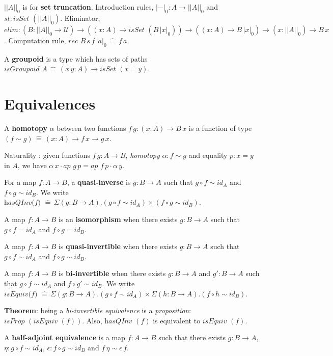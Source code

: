 \documentclass[a4paper]{article}
\begin{document}
$|| A ||_0$ is for \textbf{set truncation}. Introduction rules, $|-|_0 : A \to || A ||_0$ and $\textit{st}: \textit{isSet }(|| A ||_0)$. Eliminator, $\textit{elim}: (B : ||A||_0 \to \mathcal{U}) \to ((x : A) \to \textit{isSet }(B \, |x|_0)) \to ((x : A) \to B \, |x|_0) \to (x : || A ||_0) \to B \, x$. Computation rule, $\textit{rec } B \, s \, f \, |a|_0 \, \hat{=} \, f \, a$.

A \textbf{groupoid} is a type which has sets of paths $\textit{isGroupoid } A \, \hat{=} \, (x \, y : A) \to \textit{isSet }(x = y)$.

\section*{Equivalences}

A \textbf{homotopy} $\alpha$ between two functions $f \, g : (x : A) \to B \, x$ is a function of type $(f \sim g) \, \hat{=} \, (x : A) \to f \, x \to g \, x$.

Naturality : given functions $f \, g : A \to B$, \textit{homotopy} $\alpha : f \sim g$ and equality $p : x = y$ in $A$, we have $\alpha \, x \cdot \textit{ap } g \, p = \textit{ap } f \, p \cdot \alpha \, y$.

For a map $f : A \to B$, a \textbf{quasi-inverse} is $g : B \to A$ such that $g \circ f \sim \textit{id}_A$ and $f \circ g \sim \textit{id}_B$. We write $\textit{hasQInv(f) } \hat{=} \, \Sigma(g : B \to A).(g \circ f \sim \textit{id}_A) \times (f \circ g \sim \textit{id}_B)$.

A map $f : A \to B$ is an \textbf{isomorphism} when there exists $g : B \to A$ such that $g \circ f = \textit{id}_A$ and $f \circ g = \textit{id}_B$.

A map $f : A \to B$ is \textbf{quasi-invertible} when there exists $g : B \to A$ such that $g \circ f \sim \textit{id}_A$ and $f \circ g \sim \textit{id}_B$.

A map $f : A \to B$ is \textbf{bi-invertible} when there exists $g : B \to A$ and $g' : B \to A$ such that $g \circ f \sim \textit{id}_A$ and $f \circ g' \sim \textit{id}_B$.
We write $\textit{isEquiv(f) } \hat{=} \, \Sigma(g : B \to A).(g \circ f \sim \textit{id}_A) \times \Sigma(h : B \to A).(f \circ h \sim \textit{id}_B)$.

\textbf{Theorem}: being a \textit{bi-invertible equivalence} is a \textit{proposition}: $\textit{isProp }(\textit{isEquiv }(f))$. Also, $\textit{hasQInv }(f)$ is equivalent to $\textit{isEquiv }(f)$.

A \textbf{half-adjoint equivalence} is a map $f : A \to B$ such that there exists $g : B \to A$, $\eta : g \circ f \sim \textit{id}_A$, $\epsilon : f \circ g \sim \textit{id}_B$ and $f \, \eta \sim \epsilon \, f$.
\end{document}
